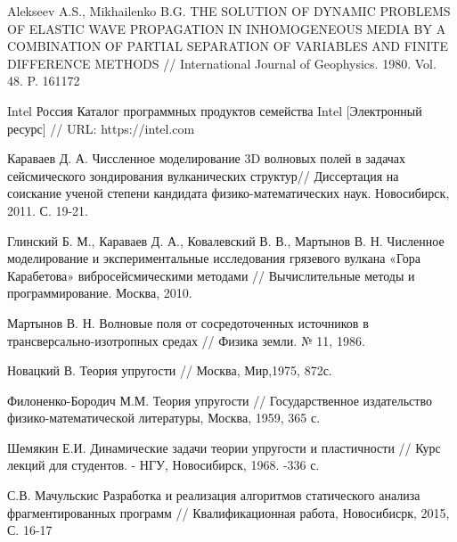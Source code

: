 \begingroup 
\renewcommand{\section}[2]{\anonsection{Библиографический список}}
\begin{thebibliography}{00}

	Alekseev A.S., Mikhailenko B.G.
	THE SOLUTION OF DYNAMIC PROBLEMS OF ELASTIC WAVE PROPAGATION IN INHOMOGENEOUS MEDIA BY A COMBINATION OF PARTIAL SEPARATION OF VARIABLES AND FINITE DIFFERENCE METHODS // International Journal of Geophysics. 1980. Vol. 48. P. 161­172

	Intel Россия
    Каталог программных продуктов семейства Intel [Электронный ресурс] //
    URL: https://intel.com

    Караваев Д. А.
    Чиссленное моделирование 3D волновых полей в задачах сейсмического зондирования вулканических структур//
    Диссертация на соискание ученой степени кандидата физико-математических наук. Новосибирск, 2011. С. 19-21.

    Глинский Б. М., Караваев Д. А., Ковалевский В. В., Мартынов В. Н.
    Численное моделирование и экспериментальные исследования грязевого вулкана «Гора Карабетова» вибросейсмическими методами //
    Вычислительные методы и программирование. Москва, 2010.

    Мартынов В. Н.
    Волновые поля от сосредоточенных источников в трансверсально-изотропных средах //
    Физика земли. № 11, 1986.

    Новацкий В.
    Теория упругости //
    Москва, Мир,1975, 872с.

	Филоненко-Бородич М.М.
	Теория упругости //
	Государственное издательство физико-математической литературы, Москва, 1959, 365 с.

	Шемякин Е.И.
	Динамические задачи теории упругости и пластичности //
	Курс лекций для студентов. - НГУ, Новосибирск, 1968. -336 с.

	С.В. Мачульскис
	Разработка и реализация алгоритмов статического анализа фрагментированных программ //
	Квалификационная работа, Новосибисрк, 2015, С. 16-17

\end{thebibliography}
\endgroup

\clearpage